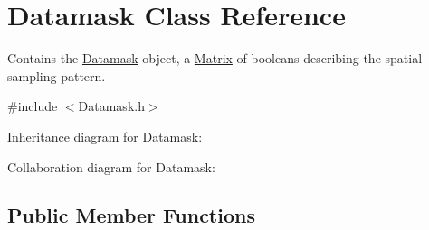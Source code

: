 \hypertarget{class_datamask}{}\section{Datamask Class Reference}
\label{class_datamask}


Contains the \hyperlink{class_datamask}{Datamask} object, a \hyperlink{class_matrix}{Matrix} of booleans describing the spatial sampling pattern.  




{\ttfamily \#include $<$Datamask.\+h$>$}



Inheritance diagram for Datamask\+:


Collaboration diagram for Datamask\+:
\subsection*{Public Member Functions}

